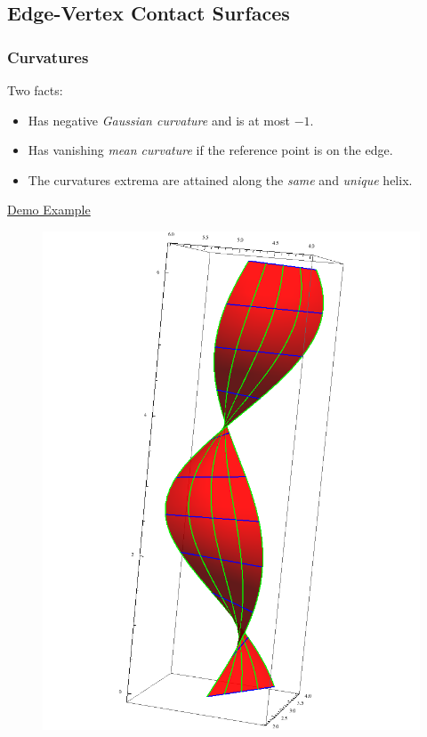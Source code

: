 \documentclass[ucs,9pt,pagenumbersfull]{beamer}
\begin{document}
\subsection{Edge-Vertex Contact Surfaces}
\begin{frame}
  \frametitle{Curvatures}
  \begin{minipage}{0.6\linewidth}
    \begin{block}{Two facts:}
      \begin{itemize}
      \item Has negative \emph{Gaussian curvature} and is at most \(-1\).
      \item Has vanishing \emph{mean curvature} if the reference point
        is on the edge.
      \item The curvatures extrema are attained along the \emph{same}
        and \emph{unique} helix.
      \end{itemize}
    \end{block}

  \begin{center}
    \href{run:Demos/ev-curvatrue.app}{Demo Example}
  \end{center}
\end{minipage}
\begin{minipage}{0.35\linewidth}
  \begin{figure}
    \centering
    \includegraphics[height=0.9\textheight]{Figures/ev-full-contact}
  \end{figure}
\end{minipage}
\end{frame}
\end{document}
